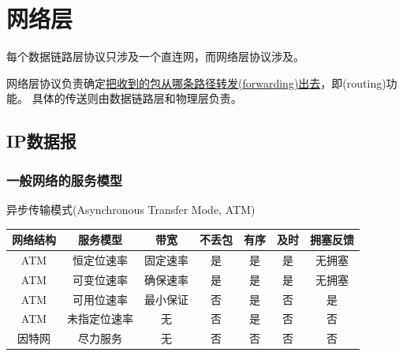 
\section{网络层}
每个数据链路层协议只涉及一个直连网，而网络层协议涉及。

网络层协议负责确定\underline{把收到的包从哪条路径转发(forwarding)出去}，即(routing)功能。
具体的传送则由数据链路层和物理层负责。

\subsection{IP数据报}
\subsubsection{一般网络的服务模型}
异步传输模式(Asynchronous Transfer Mode, ATM)
\begin{center}
\begin{tabular}{|c|c|c|c|c|c|c|}\hline
网络结构 & 服务模型 & 带宽 & 不丢包 & 有序 & 及时 & 拥塞反馈\\\hline
ATM & 恒定位速率 & 固定速率 & 是 & 是 & 是 & 无拥塞\\\hline
ATM & 可变位速率 & 确保速率 & 是 & 是 & 是 & 无拥塞\\\hline
ATM & 可用位速率 & 最小保证 & 否 & 是 & 否 & 是\\\hline
ATM & 未指定位速率 & 无 & 否 & 是 & 否 & 否\\\hline
因特网 & 尽力服务 & 无 & 否 & 否 & 否 & 否\\\hline
\end{tabular}
\end{center}

